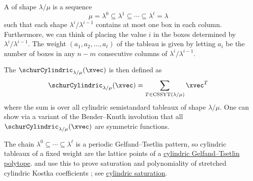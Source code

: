 A \label{cylindricSemistandardTableau}
of shape $\lambda / \mu$ is a sequence
\[
\mu = \lambda^0 \subseteq \lambda^1 \subseteq \dotsb \subseteq \lambda^{\ell} = \lambda
\]
such that each shape $\lambda^i/\lambda^{i-1}$ contains at most one box in each column.
Furthermore, we can think of placing the value $i$ in the boxes determined by
$\lambda^i/\lambda^{i-1}$.
The weight $(a_1,a_2,\dotsc,a_{\ell})$ of the tableau
is given by letting $a_i$ be the number of boxes in any $n-m$
consecutive columns of $\lambda^i/\lambda^{i-1}$.


The \label{cylindricSchurFunction}
$\schurCylindric_{\lambda/\mu}(\xvec)$ is then defined as
\[
\schurCylindric_{\lambda/\mu}(\xvec)
= \sum_{T \in \mathrm{CSSYT}(\lambda/\mu)} \xvec^T
\]
where the sum is over all cylindric semistandard tableaux of shape
$\lambda/\mu$.
One can show via a variant of the Bender--Knuth involution
that all $\schurCylindric_{\lambda/\mu}(\xvec)$ are symmetric functions.

The chain $\lambda^0 \subseteq \dotsb \subseteq \lambda^{\ell}$ is a
periodic Gelfand--Tsetlin pattern, so cylindric tableaux of a fixed weight are
the lattice points of a
\hyperref[cylindricGTPatterns]{cylindric Gelfand--Tsetlin polytope}.
 and  use this to prove
saturation and polynomiality of stretched cylindric Kostka coefficients
\cite[Thm.~30 and Cor.~41]{AlexanderssonOguz2023x}; see
\hyperref[cylindricKostkaSaturation]{cylindric saturation}.


